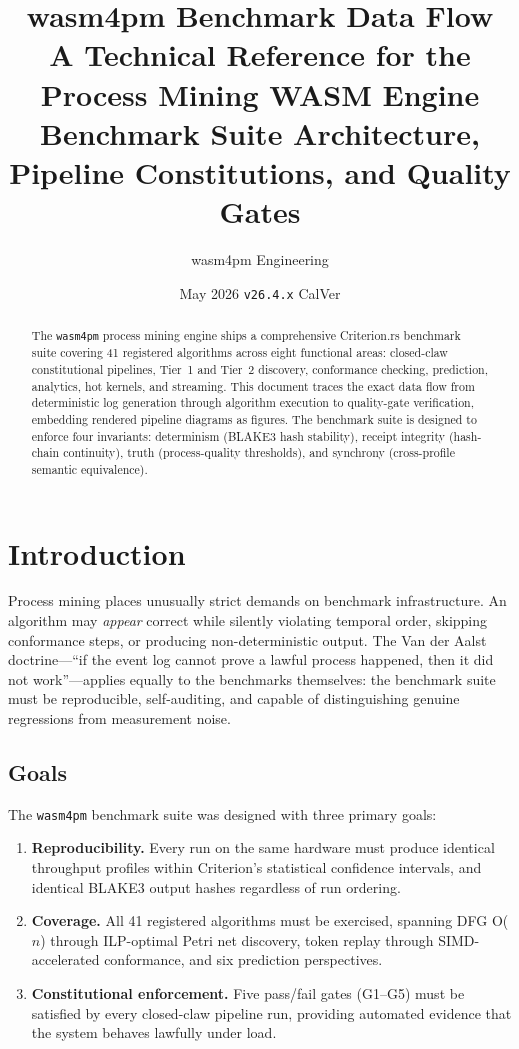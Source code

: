 \documentclass[11pt,a4paper]{article}
\title{%
  \vspace{-1cm}
  {\LARGE\bfseries wasm4pm Benchmark Data Flow}\\[0.5em]
  {\large A Technical Reference for the Process Mining WASM Engine}\\[0.5em]
  {\normalsize Benchmark Suite Architecture, Pipeline Constitutions, and Quality Gates}
}
\author{wasm4pm Engineering}
\date{May 2026 \quad\texttt{v26.4.x} \quad CalVer}
\begin{document}
\maketitle
\thispagestyle{fancy}

\begin{abstract}
The \texttt{wasm4pm} process mining engine ships a comprehensive Criterion.rs benchmark suite
covering 41 registered algorithms across eight functional areas: closed-claw constitutional
pipelines, Tier~1 and Tier~2 discovery, conformance checking, prediction, analytics, hot
kernels, and streaming. This document traces the exact data flow from deterministic log
generation through algorithm execution to quality-gate verification, embedding rendered
pipeline diagrams as figures. The benchmark suite is designed to enforce four invariants:
determinism (BLAKE3 hash stability), receipt integrity (hash-chain continuity), truth
(process-quality thresholds), and synchrony (cross-profile semantic equivalence).
\end{abstract}

\tableofcontents
\newpage

\section{Introduction}
\label{sec:intro}

Process mining places unusually strict demands on benchmark infrastructure.
An algorithm may \emph{appear} correct while silently violating temporal
order, skipping conformance steps, or producing non-deterministic output.
The Van der Aalst doctrine---``if the event log cannot prove a lawful
process happened, then it did not work''---applies equally to the
benchmarks themselves: the benchmark suite must be reproducible,
self-auditing, and capable of distinguishing genuine regressions from
measurement noise.

\subsection{Goals}

The \texttt{wasm4pm} benchmark suite was designed with three primary goals:

\begin{enumerate}
  \item \textbf{Reproducibility.} Every run on the same hardware must
        produce identical throughput profiles within Criterion's
        statistical confidence intervals, and identical BLAKE3 output
        hashes regardless of run ordering.
  \item \textbf{Coverage.} All 41 registered algorithms must be exercised,
        spanning DFG O($n$) through ILP-optimal Petri net discovery, token
        replay through SIMD-accelerated conformance, and six prediction
        perspectives.
  \item \textbf{Constitutional enforcement.} Five pass/fail gates (G1--G5)
        must be satisfied by every closed-claw pipeline run, providing
        automated evidence that the system behaves lawfully under load.
\end{enumerate}
\end{document}
